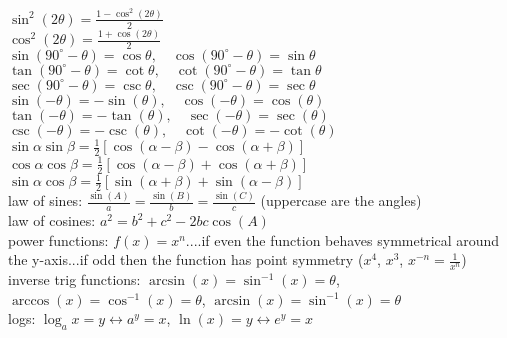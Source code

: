 \documentclass{article}
\begin{document}
$ \sin^2(2\theta) = \frac{1 - \cos^2(2\theta)}{2} $\\

$ \cos^2(2\theta) = \frac{1 + \cos(2\theta)}{2} $\\

$ \sin(90^\circ - \theta) = \cos \theta, \quad \cos(90^\circ - \theta) = \sin \theta $\\

$ \tan(90^\circ - \theta) = \cot \theta, \quad \cot(90^\circ - \theta) = \tan \theta $\\

$ \sec(90^\circ - \theta) = \csc \theta, \quad \csc(90^\circ - \theta) = \sec \theta $\\

$ \sin(-\theta) = -\sin(\theta), \quad \cos(-\theta) = \cos(\theta) $\\

$ \tan(-\theta) = -\tan(\theta), \quad \sec(-\theta) = \sec(\theta) $\\

$ \csc(-\theta) = -\csc(\theta), \quad \cot(-\theta) = -\cot(\theta) $\\

$ \sin \alpha \sin \beta = \frac{1}{2} [\cos(\alpha - \beta) - \cos(\alpha + \beta)] $\\

$ \cos \alpha \cos \beta = \frac{1}{2} [\cos(\alpha - \beta) + \cos(\alpha + \beta)] $\\

$ \sin \alpha \cos \beta = \frac{1}{2} [\sin(\alpha + \beta) + \sin(\alpha - \beta)] $\\

law of sines: $ \frac{\sin(A)}{a} = \frac{\sin(B)}{b} = \frac{\sin(C)}{c} $ (uppercase are the angles)\\

law of cosines: $ a^2 = b^2+c^2 - 2bc\cos(A) $\\

power functions: $f(x) = x^n$....if even the function behaves symmetrical around the y-axis...if odd then the function has point symmetry ($x^4$, $x^3$, $x^{-n} = \frac{1}{x^n}$)\\

inverse trig functions: $\arcsin(x) = \sin^{-1}(x) = \theta$, $\arccos(x) = \cos^{-1}(x) = \theta$, $\arcsin(x) = \sin^{-1}(x) = \theta$\\

logs: $\log_ax=y \leftrightarrow a^y = x$, $\ln(x)=y \leftrightarrow e^y=x$\\
\end{document}
